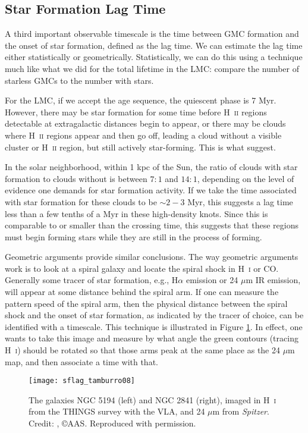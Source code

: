 \subsection{Star Formation Lag Time}

A third important observable timescale is the time between GMC formation and the onset of star formation, defined as the lag time. We can estimate the lag time either statistically or geometrically. Statistically, we can do this using a technique much like what we did for the total lifetime in the LMC: compare the number of starless GMCs to the number with stars.

For the LMC, if we accept the \citet{kawamura09a} age sequence, the quiescent phase is 7 Myr. However, there may be star formation for some time before H~\textsc{ii} regions detectable at extragalactic distances begin to appear, or there may be clouds where H~\textsc{ii} regions appear and then go off, leading a cloud without a visible cluster or H~\textsc{ii} region, but still actively star-forming. This is what \citet{goldbaum11a} suggest.

In the solar neighborhood, within 1 kpc of the Sun, the ratio of clouds with star formation to clouds without is between $7:1$ and $14:1$, depending on the level of evidence one demands for star formation activity. If we take the time associated with star formation for these clouds to be $\sim 2-3$ Myr, this suggests a lag time less than a few tenths of a Myr in these high-density knots. Since this is comparable to or smaller than the crossing time, this suggests that these regions must begin forming stars while they are still in the process of forming.

Geometric arguments provide similar conclusions. The way geometric arguments work is to look at a spiral galaxy and locate the spiral shock in H~\textsc{i} or CO. Generally some tracer of star formation, e.g., H$\alpha$ emission or 24 $\mu$m IR emission, will appear at some distance behind the spiral arm. If one can measure the pattern speed of the spiral arm, then the physical distance between the spiral shock and the onset of star formation, as indicated by the tracer of choice, can be identified with a timescale. This technique is illustrated in Figure \ref{fig:sflag_tamburro08}. In effect, one wants to take this image and measure by what angle the green contours (tracing H~\textsc{i}) should be rotated so that those arms peak at the same place as the 24 $\mu$m map, and then associate a time with that.

\begin{figure}
\texttt{[image: sflag\_tamburro08]}
\caption[H~\textsc{i} and 24 $\mu$m maps of NGC 5194 and 2841]{
\label{fig:sflag_tamburro08}
The galaxies NGC 5194 (left) and NGC 2841 (right), imaged in H~\textsc{i} from the THINGS survey with the VLA, and 24 $\mu$m from \textit{Spitzer}. Credit: \citet{tamburro08a}, \copyright AAS. Reproduced with permission.
}
\end{figure}

